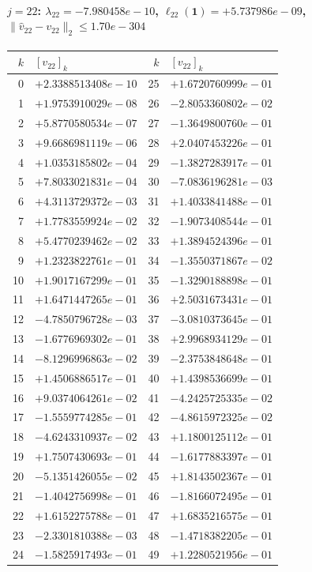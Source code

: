 \paragraph{$j = 22$: $\lambda_{22} = -7.980458e-10$, \quad $\ell_{22}(\mathbf{1}) = +5.737986e-09$, \quad $\|\hat{v}_{22} - v_{22}\|_2 \leq 1.70e-304$}
\begin{center}
{\footnotesize
\begin{tabular}{r@{\;\;}l@{\quad}r@{\;\;}l}
\toprule
$k$ & $[v_{22}]_k$ & $k$ & $[v_{22}]_k$ \\
\midrule
0 & $+2.3388513408e-10$ & 25 & $+1.6720760999e-01$ \\
1 & $+1.9753910029e-08$ & 26 & $-2.8053360802e-02$ \\
2 & $+5.8770580534e-07$ & 27 & $-1.3649800760e-01$ \\
3 & $+9.6686981119e-06$ & 28 & $+2.0407453226e-01$ \\
4 & $+1.0353185802e-04$ & 29 & $-1.3827283917e-01$ \\
5 & $+7.8033021831e-04$ & 30 & $-7.0836196281e-03$ \\
6 & $+4.3113729372e-03$ & 31 & $+1.4033841488e-01$ \\
7 & $+1.7783559924e-02$ & 32 & $-1.9073408544e-01$ \\
8 & $+5.4770239462e-02$ & 33 & $+1.3894524396e-01$ \\
9 & $+1.2323822761e-01$ & 34 & $-1.3550371867e-02$ \\
10 & $+1.9017167299e-01$ & 35 & $-1.3290188898e-01$ \\
11 & $+1.6471447265e-01$ & 36 & $+2.5031673431e-01$ \\
12 & $-4.7850796728e-03$ & 37 & $-3.0810373645e-01$ \\
13 & $-1.6776969302e-01$ & 38 & $+2.9968934129e-01$ \\
14 & $-8.1296996863e-02$ & 39 & $-2.3753848648e-01$ \\
15 & $+1.4506886517e-01$ & 40 & $+1.4398536699e-01$ \\
16 & $+9.0374064261e-02$ & 41 & $-4.2425725335e-02$ \\
17 & $-1.5559774285e-01$ & 42 & $-4.8615972325e-02$ \\
18 & $-4.6243310937e-02$ & 43 & $+1.1800125112e-01$ \\
19 & $+1.7507430693e-01$ & 44 & $-1.6177883397e-01$ \\
20 & $-5.1351426055e-02$ & 45 & $+1.8143502367e-01$ \\
21 & $-1.4042756998e-01$ & 46 & $-1.8166072495e-01$ \\
22 & $+1.6152275788e-01$ & 47 & $+1.6835216575e-01$ \\
23 & $-2.3301810388e-03$ & 48 & $-1.4718382205e-01$ \\
24 & $-1.5825917493e-01$ & 49 & $+1.2280521956e-01$ \\
\bottomrule
\end{tabular}
}
\end{center}

